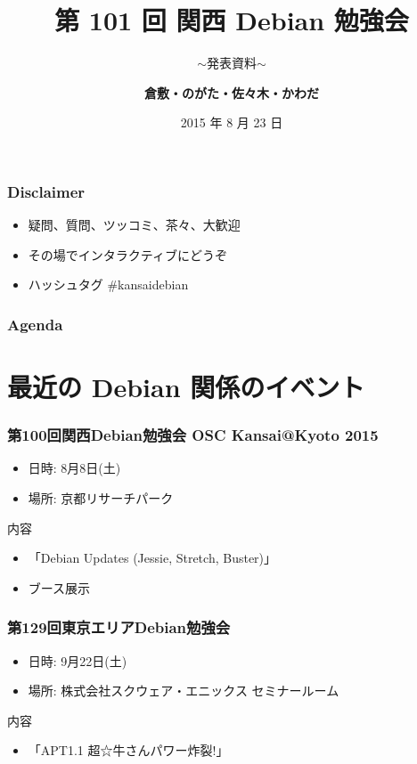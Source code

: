 \documentclass[cjk,dvipdfmx,10pt,compress,%
hyperref={bookmarks=true,bookmarksnumbered=true,bookmarksopen=false,%
colorlinks=false,%
pdftitle={第 101 回 関西 Debian 勉強会},%
pdfauthor={倉敷・のがた・佐々木・かわだ},%
pdfsubject={資料},%
}]{beamer}
\title{第 101 回 関西 Debian 勉強会}
\subtitle{$\sim$発表資料$\sim$}
\author[かわだ てつたろう]{{\large\bf 倉敷・のがた・佐々木・かわだ}}
\institute[Debian JP]{{\normalsize\tt 関西 Debian 勉強会}}
\date{{\small 2015 年 8 月 23 日}}
\begin{document}
\settitleslide
\begin{frame}
\titlepage
\end{frame}
\setdefaultslide

\begin{frame}[fragile]
  \frametitle{Disclaimer}
  \begin{itemize}
  \item 疑問、質問、ツッコミ、茶々、\alert{大歓迎}
  \item その場でインタラクティブにどうぞ
  \item ハッシュタグ \#kansaidebian
  \end{itemize}
\end{frame}

\begin{frame}[fragile]
\frametitle{Agenda}

\tableofcontents

\end{frame}

\section{最近の Debian 関係のイベント}


\begin{frame}[fragile]
  \frametitle{第100回関西Debian勉強会 OSC Kansai@Kyoto 2015}
  \begin{itemize}
  \item 日時: 8月8日(土)
  \item 場所: 京都リサーチパーク
  \end{itemize}
  \begin{block}{内容}
    \begin{itemize}
    \item 「Debian Updates (Jessie, Stretch, Buster)」
    \item ブース展示
    \end{itemize}
  \end{block}
\end{frame}

\begin{frame}[fragile]
  \frametitle{第129回東京エリアDebian勉強会}
  \begin{itemize}
  \item 日時: 9月22日(土)
  \item 場所: 株式会社スクウェア・エニックス セミナールーム
  \end{itemize}
  \begin{block}{内容}
    \begin{itemize}
    \item 「APT1.1 超☆牛さんパワー炸裂!」
    \end{itemize}
  \end{block}
\end{frame}
\end{document}
